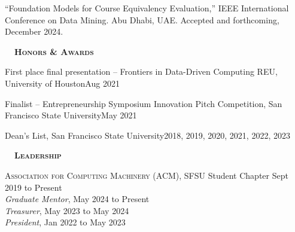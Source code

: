 \documentclass[hidelinks, 10pt]{article}
\def\contentwidth{0.9\linewidth}    %
\def\contentspacing{2.5mm}          %
\def\sectionspacing{6mm}            %
\def\sectiontocontentspacing{4mm}   %
\renewcommand{\section}[1]{
    {\fontsize{14}{14}\selectfont \textsc{\textbf{\ \ #1\ \ }}}\hrulefill
}
\begin{document}
{\vspace{\contentspacing}

\begin{minipage}[ct]{\contentwidth}
    ``Foundation Models for Course Equivalency Evaluation,'' IEEE International Conference on Data Mining.  Abu Dhabi, UAE.  Accepted and
    forthcoming, December 2024.
\end{minipage}

\vspace{\sectionspacing}


\section{Honors \& Awards}

\vspace{\sectiontocontentspacing}

\begin{minipage}[ct]{0.9\linewidth}
    First place final presentation -- Frontiers in Data-Driven Computing REU,
    University of Houston\hfill Aug 2021

    \vspace{1.5mm}

    Finalist -- Entrepreneurship Symposium Innovation Pitch Competition, San
    Francisco State University\hfill May 2021

    \vspace{1.5mm}

    Dean's List, San Francisco State University\hfill 2018, 2019, 2020, 2021, 2022, 2023
\end{minipage}

\vspace{\sectionspacing}


\section{Leadership}

\vspace{\sectiontocontentspacing}

\begin{minipage}[ct]{0.9\linewidth}
    \textsc{Association for Computing Machinery} (ACM), SFSU Student Chapter\hfill
    Sept 2019 to Present\\
    \emph{Graduate Mentor}, May 2024 to Present\\
    \emph{Treasurer}, May 2023 to May 2024\\
    \emph{President}, Jan 2022 to May 2023
\end{minipage}

}
\end{document}
